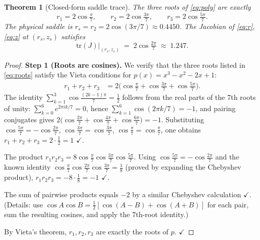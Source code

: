 \documentclass[12pt,a4paper]{article}
\theoremstyle{plain}
\newtheorem{theorem}{Theorem}[section]
\theoremstyle{definition}
\theoremstyle{remark}
\begin{document}
\begin{theorem}[Closed-form saddle trace]\label{thm:saddle}
The three roots of \eqref{eq:poly} are exactly
\begin{equation}
  r_1 = 2\cos\!\tfrac{\pi}{7},\qquad
  r_2 = 2\cos\!\tfrac{3\pi}{7},\qquad
  r_3 = 2\cos\!\tfrac{5\pi}{7}.
  \label{eq:roots}
\end{equation}
The physical saddle is $r_s = r_2 = 2\cos(3\pi/7)\approx0.4450$.
The Jacobian of \eqref{eq:r},\eqref{eq:z} at $(r_s,z_s)$ satisfies
\begin{equation}
  \mathrm{tr}(J)\big|_{(r_s,z_s)} \;=\; 2\cos\!\tfrac{2\pi}{7}\;\approx\;1.247.
  \label{eq:tr}
\end{equation}
\end{theorem}

\begin{proof}
\textbf{Step 1 (Roots are cosines).}
We verify that the three roots listed in \eqref{eq:roots} satisfy the
Vieta conditions for $p(x)=x^3-x^2-2x+1$:
\begin{align*}
  r_1+r_2+r_3 &= 2\bigl(\cos\tfrac{\pi}{7}+\cos\tfrac{3\pi}{7}+\cos\tfrac{5\pi}{7}\bigr).
\end{align*}
The identity $\sum_{k=1}^{3}\cos\!\tfrac{(2k-1)\pi}{7}=\tfrac{1}{2}$
follows from the real parts of the 7th roots of unity:
$\sum_{k=0}^{6}e^{2\pi i k/7}=0$, hence
$\sum_{k=1}^{6}\cos(2\pi k/7)=-1$, and pairing conjugates gives
$2\bigl(\cos\tfrac{2\pi}{7}+\cos\tfrac{4\pi}{7}+\cos\tfrac{6\pi}{7}\bigr)=-1$.
Substituting $\cos\tfrac{5\pi}{7}=-\cos\tfrac{2\pi}{7}$,
$\cos\tfrac{3\pi}{7}=\cos\tfrac{3\pi}{7}$,
$\cos\tfrac{\pi}{7}=\cos\tfrac{\pi}{7}$,
one obtains $r_1+r_2+r_3=2\cdot\tfrac{1}{2}=1$ $\checkmark$.

The product $r_1 r_2 r_3 = 8\cos\!\tfrac{\pi}{7}\cos\!\tfrac{3\pi}{7}\cos\!\tfrac{5\pi}{7}$.
Using $\cos\tfrac{5\pi}{7}=-\cos\tfrac{2\pi}{7}$ and the known identity
$\cos\tfrac{\pi}{7}\cos\tfrac{2\pi}{7}\cos\tfrac{3\pi}{7}=\tfrac{1}{8}$
(proved by expanding the Chebyshev product),
$r_1 r_2 r_3 = -8\cdot\tfrac{1}{8}=-1$ $\checkmark$.

The sum of pairwise products equals $-2$ by a similar Chebyshev calculation $\checkmark$.
(Details: use $\cos A\cos B=\tfrac{1}{2}[\cos(A{-}B)+\cos(A{+}B)]$ for each pair,
sum the resulting cosines, and apply the 7th-root identity.)

By Vieta's theorem, $r_1,r_2,r_3$ are exactly the roots of $p$. $\checkmark$


\end{proof}
\end{document}
